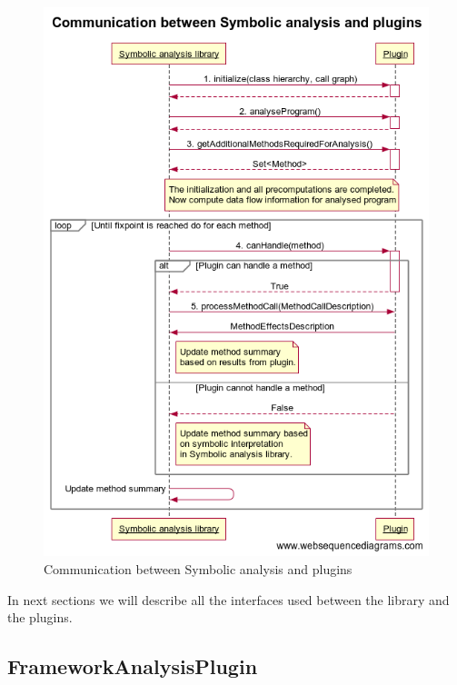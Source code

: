 \begin{figure}[p]
  \includegraphics[trim={0cm 0.75cm 0cm 1.4cm},clip,width=\textwidth,height=\textheight]{img/analysis-plugins-communication.png}
  \caption{Communication between Symbolic analysis and plugins}
  \label{implementation:analysis-plugins-communication}
\end{figure}

In next sections we will describe all the interfaces used between the library and the plugins.



\subsection{FrameworkAnalysisPlugin}

